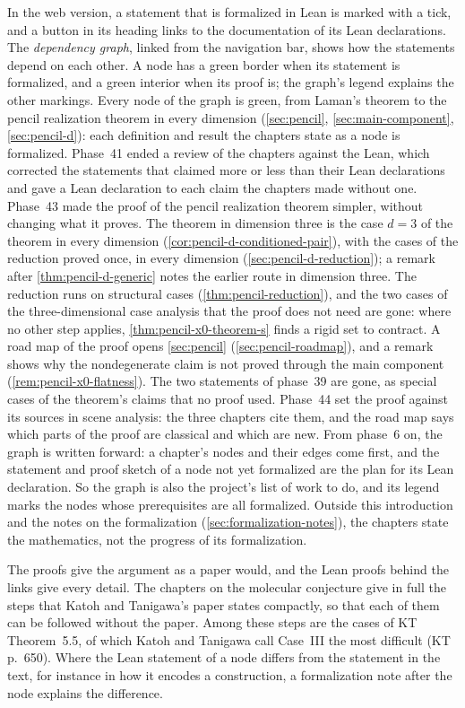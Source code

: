In the web version, a statement that is formalized in Lean is marked with
a tick, and a button in its heading links to the documentation of its
Lean declarations. The \emph{dependency graph}, linked from the
navigation bar, shows how the statements depend on each other. A node has
a green border when its statement is formalized, and a green interior
when its proof is; the graph's legend explains the other markings.
Every node of the graph is green, from Laman's theorem to the pencil
realization theorem in every dimension (\cref{sec:pencil},
\cref{sec:main-component}, \cref{sec:pencil-d}): each definition and
result the chapters state as a node is formalized.
Phase~41 ended a review of the chapters against the Lean, which corrected
the statements that claimed more or less than their Lean declarations
and gave a Lean declaration to each claim the chapters made without one.
Phase~43 made the proof of the pencil realization theorem simpler,
without changing what it proves. The theorem in dimension three is the
case $d = 3$ of the theorem in every dimension
(\cref{cor:pencil-d-conditioned-pair}), with the cases of the reduction
proved once, in every dimension (\cref{sec:pencil-d-reduction}); a remark
after \cref{thm:pencil-d-generic} notes the earlier route in dimension
three. The reduction runs on structural cases (\cref{thm:pencil-reduction}),
and the two cases of the three-dimensional case analysis that the proof
does not need are gone: where no other step applies,
\cref{thm:pencil-x0-theorem-s} finds a rigid set to contract. A road map of the proof opens
\cref{sec:pencil} (\cref{sec:pencil-roadmap}), and a remark shows why the
nondegenerate claim is not proved through the main component
(\cref{rem:pencil-x0-flatness}). The two statements of phase~39 are gone,
as special cases of the theorem's claims that no proof used.
Phase~44 set the proof against its sources in scene analysis: the three
chapters cite them, and the road map says which parts of the proof are
classical and which are new.
From phase~6 on, the graph is written forward: a chapter's nodes and
their edges come first, and the statement and proof sketch of a node not
yet formalized are the plan for its Lean declaration. So the graph is
also the project's list of work to do, and its legend marks the nodes
whose prerequisites are all formalized. Outside this introduction and the
notes on the formalization (\cref{sec:formalization-notes}), the chapters
state the mathematics, not the progress of its formalization.

The proofs give the argument as a paper would, and the Lean proofs
behind the links give every detail. The chapters on the molecular
conjecture give in full the steps that Katoh and Tanigawa's paper states
compactly, so that each of them can be followed without the paper. Among
these steps are the cases of KT Theorem~5.5, of which Katoh and Tanigawa
call Case~III the most difficult (KT p.~650). Where the Lean statement of
a node differs from the statement in the text, for instance in how it
encodes a construction, a formalization note after the node explains the
difference.

